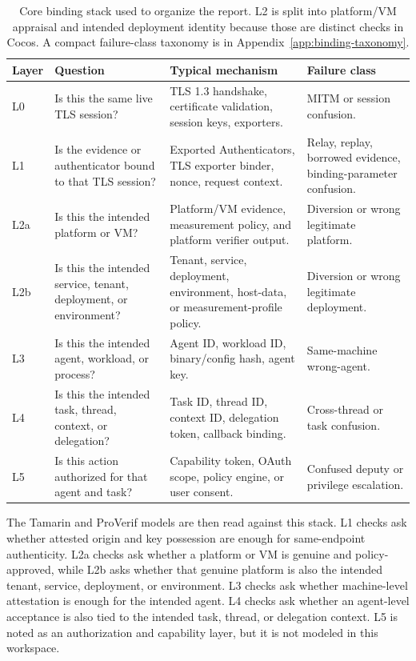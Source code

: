 \documentclass[11pt,a4paper]{article}
\begin{document}
\begin{table}[H]
\centering
\footnotesize
\begin{tabularx}{\textwidth}{@{}>{\raggedright\arraybackslash}p{}>{\raggedright\arraybackslash}p{}>{\raggedright\arraybackslash}p{}>{\raggedright\arraybackslash}X@{}}
\toprule
\textbf{Layer} & \textbf{Question} & \textbf{Typical mechanism} & \textbf{Failure class} \\
\midrule
L0 & Is this the same live TLS session? & TLS 1.3 handshake, certificate validation, session keys, exporters. & MITM or session confusion. \\
L1 & Is the evidence or authenticator bound to that TLS session? & Exported Authenticators, TLS exporter binder, nonce, request context. & Relay, replay, borrowed evidence, binding-parameter confusion. \\
L2a & Is this the intended platform or VM? & Platform/VM evidence, measurement policy, and platform verifier output. & Diversion or wrong legitimate platform. \\
L2b & Is this the intended service, tenant, deployment, or environment? & Tenant, service, deployment, environment, host-data, or measurement-profile policy. & Diversion or wrong legitimate deployment. \\
L3 & Is this the intended agent, workload, or process? & Agent ID, workload ID, binary/config hash, agent key. & Same-machine wrong-agent. \\
L4 & Is this the intended task, thread, context, or delegation? & Task ID, thread ID, context ID, delegation token, callback binding. & Cross-thread or task confusion. \\
L5 & Is this action authorized for that agent and task? & Capability token, OAuth scope, policy engine, or user consent. & Confused deputy or privilege escalation. \\
\bottomrule
\end{tabularx}
\caption{Core binding stack used to organize the report. L2 is split into platform/VM appraisal and intended deployment identity because those are distinct checks in Cocos. A compact failure-class taxonomy is in Appendix~\ref{app:binding-taxonomy}.}
\label{tab:core-binding-stack}
\end{table}

The Tamarin and ProVerif models are then read against this stack. L1 checks
ask whether attested origin and key possession are enough for same-endpoint
authenticity. L2a checks ask whether a platform or VM is genuine and
policy-approved, while L2b asks whether that genuine platform is also the
intended tenant, service, deployment, or environment. L3 checks ask whether
machine-level attestation is enough for the intended agent. L4 checks ask
whether an agent-level acceptance is also tied to the intended task, thread, or
delegation context. L5 is noted
as an authorization and capability layer, but it is not modeled in this
workspace.
\end{document}
